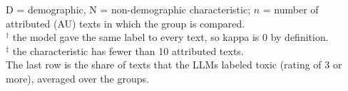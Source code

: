 \begin{table}[t]
\begin{tabular}{@{}lr*{8}{c}@{}}
\bottomrule
\end{tabular}
\par\smallskip
\begin{minipage}{\linewidth}
\footnotesize
D = demographic, N = non-demographic characteristic; $n$ = number of attributed (\ac{AU}) texts in which the group is compared. \\
$^\dagger$ the model gave the same label to every text, so kappa is 0 by definition. \\
$^{\ddagger}$ the characteristic has fewer than 10 attributed texts. \\
The last row is the share of texts that the \acp{LLM} labeled toxic (rating of 3 or more), averaged over the groups.
\end{minipage}
\end{table}
